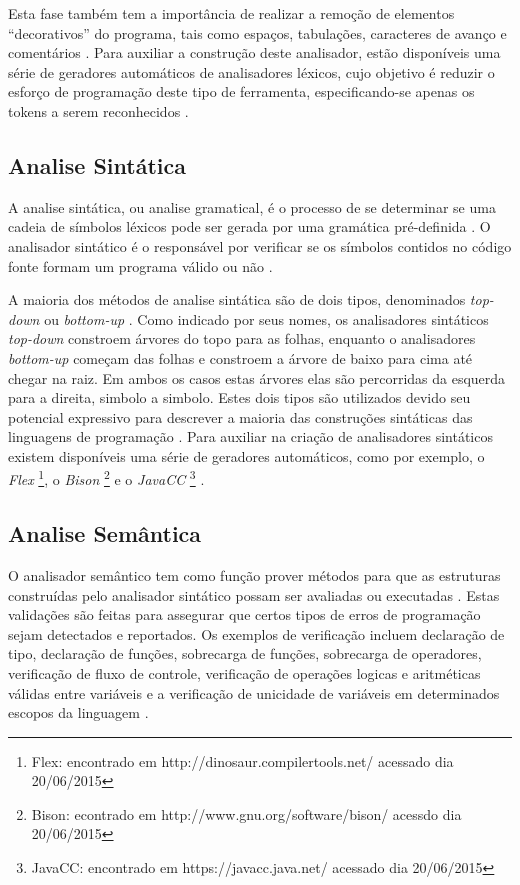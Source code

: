 Esta fase também tem a importância de realizar a remoção de elementos 
“decorativos” do programa, tais como espaços, tabulações, caracteres de 
avanço e comentários \cite{ref15}. Para auxiliar a construção deste analisador,
 estão disponíveis uma série de geradores automáticos de analisadores léxicos, 
cujo objetivo é reduzir o esforço de programação deste tipo de ferramenta, 
especificando-se apenas os tokens a serem reconhecidos \cite{ref18}.

\subsection{Analise Sintática}

A analise sintática, ou analise gramatical, é o processo de se determinar 
se uma cadeia de símbolos léxicos pode ser gerada por uma gramática pré-definida
 \cite{ref19}. O analisador sintático é o responsável por verificar se os 
símbolos contidos no código fonte formam um programa válido ou não \cite{ref20}.

A maioria dos métodos de analise sintática são de dois tipos, denominados 
\textit{top-down} ou \textit{bottom-up} \cite{ref21}. Como indicado por 
seus nomes, os analisadores sintáticos \textit{top-down} constroem árvores 
do topo para as folhas, enquanto o analisadores \textit{bottom-up} começam das 
folhas e constroem a árvore de baixo para cima até chegar na raiz. Em ambos os
 casos  estas árvores  elas são percorridas da esquerda para a direita, 
simbolo a simbolo. Estes dois tipos são utilizados devido seu potencial 
expressivo para descrever a maioria das construções sintáticas das linguagens 
de programação \cite{ref20}. Para auxiliar na criação de analisadores sintáticos 
existem disponíveis uma série de geradores automáticos, como por exemplo, 
o \textit{Flex} 
\footnote{Flex: encontrado em http://dinosaur.compilertools.net/ acessado dia 
20/06/2015}, 
o \textit{Bison} 
\footnote{Bison: econtrado em http://www.gnu.org/software/bison/ acessdo dia 
20/06/2015}
 e o \textit{JavaCC} 
\footnote{JavaCC: encontrado em https://javacc.java.net/ acessado dia 20/06/2015}
 \cite{ref22}.

\subsection{Analise Semântica}

O analisador semântico tem como função prover métodos para que as estruturas 
construídas pelo analisador sintático possam ser avaliadas ou executadas \cite{ref23}. 
Estas validações são feitas para assegurar que certos tipos de erros de 
programação sejam detectados e reportados. Os  exemplos de verificação incluem 
declaração de tipo, declaração de funções, sobrecarga de funções, sobrecarga de 
operadores, verificação de fluxo de controle, verificação de operações logicas e 
aritméticas válidas entre variáveis e a verificação de unicidade de variáveis em 
determinados escopos da linguagem \cite{ref24}.

